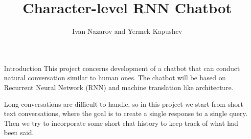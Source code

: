 \documentclass[12pt,a4paper]{article}
\title{Character-level RNN Chatbot}
\author{Ivan Nazarov and Yermek Kapushev}
\begin{document}
\maketitle


\begin{section}{Introduction}
This project concerns development of a chatbot that can conduct natural conversation
similar to human ones.
The chatbot will be based on Recurrent Neural Network (RNN) and machine translation like architecture.

Long conversations are difficult to handle, so in this project we start from short-text conversations,
where the goal is to create a single response to a single query.
Then we try to incorporate some short chat history to keep track of what had been said.
\end{section}
\end{document}
